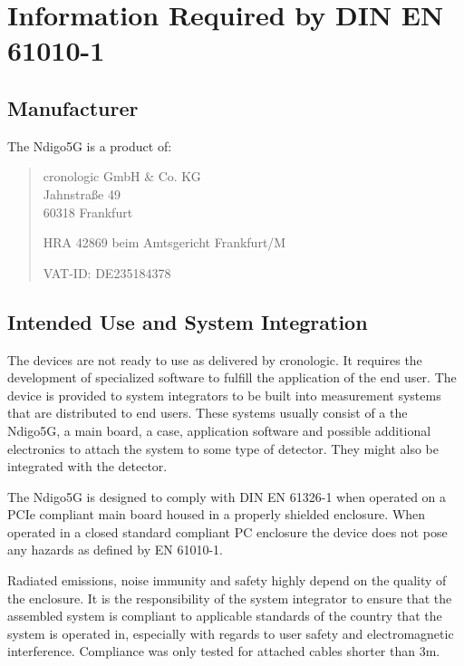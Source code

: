 \section{Information Required by DIN EN 61010-1}
\subsection{Manufacturer\label{cp:manu}}

The Ndigo5G is a product of:\

\begin{quote}
	cronologic GmbH \& Co. KG\\
	Jahnstra\ss{}e 49\\
	60318 Frankfurt\par
	\noindent HRA 42869 beim Amtsgericht Frankfurt/M\par
	\noindent VAT-ID: DE235184378
\end{quote}

\subsection{Intended Use and System Integration}

	The devices are not ready to use as delivered by cronologic. It requires the development of specialized software to fulfill the application of the end user. The device is provided to system integrators to be built into measurement systems that are distributed to end users. These systems usually consist of a the Ndigo5G, a main board, a case, application software and possible additional electronics to attach the system to some type of detector. They might also be integrated with the detector.\par

	The Ndigo5G is designed to comply with DIN EN 61326-1 when operated on a PCIe compliant main board housed in a properly shielded enclosure. When operated in a closed standard compliant PC enclosure the device does not pose any hazards as defined by EN 61010-1.\par

	Radiated emissions, noise immunity and safety highly depend on the quality of the enclosure. It is the responsibility of the system integrator to ensure that the assembled system is compliant to applicable standards of the country that the system is operated in, especially with regards to user safety and electromagnetic interference. Compliance was only tested for attached cables shorter than 3m.\par

